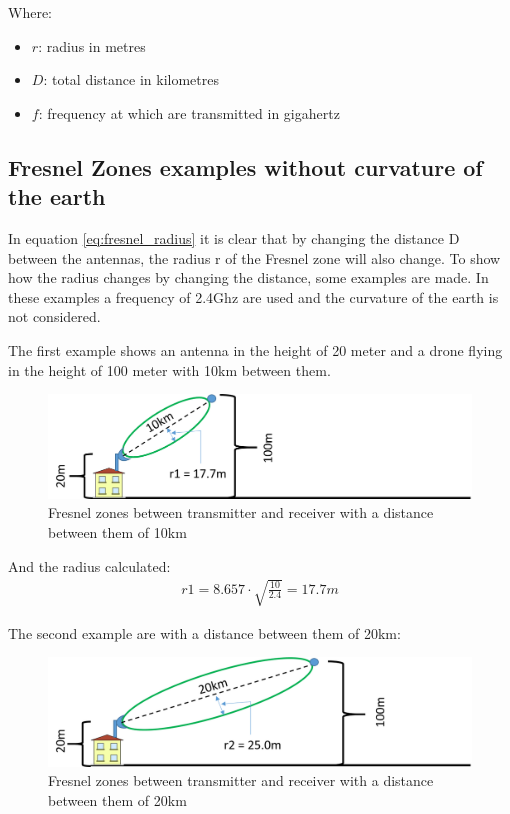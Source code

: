 Where:
\begin{itemize}[label=]
    \item $r$: radius in metres
    \item $D$: total distance in kilometres
    \item $f$: frequency at which are transmitted in gigahertz
\end{itemize}

\subsection{Fresnel Zones examples without curvature of the earth}
In equation \ref{eq:fresnel_radius} it is clear that by changing the distance D between the antennas, the radius r of the Fresnel zone will also change. To show how the radius changes by changing the distance, some examples are made. In these examples a frequency of 2.4Ghz are used and the curvature of the earth is not considered.

The first example shows an antenna in the height of 20 meter and a drone flying in the height of 100 meter with 10km between them.

\begin{figure}[H]
	\centering
	\includegraphics[scale=0.50]{figures/fresnel_10km.png}
	\caption{Fresnel zones between transmitter and receiver with a distance between them of 10km}
	\label{fig:fresnel_zones_10km}
\end{figure}  

\noindent And the radius calculated:
\begin{align*}
r1 = 8.657\cdot \sqrt{\frac{10}{2.4}} = 17.7m
\end{align*}

\noindent The second example are with a distance between them of 20km:

\begin{figure}[H]
	\centering
	\includegraphics[scale=0.50]{figures/fresnel_20km.png}
	\caption{Fresnel zones between transmitter and receiver with a distance between them of 20km}
	\label{fig:fresnel_zones_20km}
\end{figure}  

